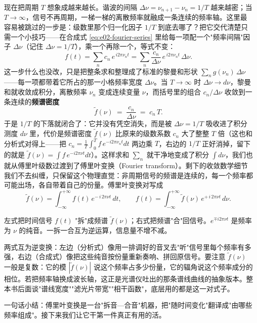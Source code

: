 现在把周期 \(T\) 想象成越来越长。谐波的间隔 \(\Delta\nu=\nu_{n+1}-\nu_n=1/T\) 越来越密；当 \(T\to\infty\)，信号不再周期，一梯一梯的离散频率就融成一条连续的频率轴。这里最容易被跳过的一步是：级数里那个归一化因子 \(1/T\) 到底去哪了？把它交代清楚只需一个小技巧——在合成式 \eqref{eq:e02-fourier-series} 里给每一项配一个"频率间隔"因子 \(\Delta\nu\)（记住 \(\Delta\nu=1/T\)），乘一个再除一个，等式不变：
\[
  f(t)=\sum_{n} c_n\,e^{\,i2\pi\nu_n t}
      =\sum_{n} \frac{c_n}{\Delta\nu}\,e^{\,i2\pi\nu_n t}\,\Delta\nu .
\]
这一步什么也没改，只是把整条求和整理成了标准的黎曼和形状 \(\sum_n g(\nu_n)\,\Delta\nu\)——每一项都带着它所占的那一小格频率宽度 \(\Delta\nu\)。当 \(T\to\infty\) 时 \(\Delta\nu\to d\nu\)，黎曼和就收敛成积分，离散频率 \(\nu_n\) 变成连续变量 \(\nu\)，而括号里的组合 \(c_n/\Delta\nu\) 收敛到一条连续的\textbf{频谱密度}
\[
  \tilde f(\nu)\;=\;\frac{c_n}{\Delta\nu}\;=\;c_n\,T .
\]
于是 \(1/T\) 的下落就闭合了：它并没有凭空消失，而是被 \(\Delta\nu=1/T\) 吸收进了积分测度 \(d\nu\) 里，代价是频谱密度 \(\tilde f(\nu)\) 比原来的级数系数 \(c_n\) 大了整整 \(T\) 倍（这也和分析式对得上——把 \(c_n=\frac1T\int_0^T f\,e^{-i2\pi\nu_n t}dt\) 两边乘 \(T\)，右边的 \(1/T\) 正好消掉，留下的就是 \(\tilde f(\nu)=\int f\,e^{-i2\pi\nu t}dt\)）。这样求和 \(\sum_n\) 就干净地变成了积分 \(\int d\nu\)，我们也就从傅里叶级数过渡到了傅里叶变换（Fourier transform）。剩下的收敛数学细节我们不去纠缠，只保留这个物理直觉：非周期信号的频谱是连续的，每一个频率都可能出场，各自带着自己的份量。傅里叶变换对写成
\begin{equation}
  \tilde f(\nu)=\int_{-\infty}^{+\infty} f(t)\,e^{-\,i\,2\pi\nu t}\,dt,
  \qquad
  f(t)=\int_{-\infty}^{+\infty} \tilde f(\nu)\,e^{+\,i\,2\pi\nu t}\,d\nu .
  \label{eq:e02-fourier-transform}
\end{equation}
\begin{formulaexplain}
左式把时间信号 \(f(t)\) "拆"成频谱 \(\tilde f(\nu)\)；右式把频谱"合"回信号。\(e^{\mp i2\pi\nu t}\) 是频率为 \(\nu\) 的纯音。一拆一合互为逆运算，信息量不增不减。
\end{formulaexplain}
两式互为逆变换：左边（分析式）像用一排调好的音叉去"听"信号里每个频率有多强，右边（合成式）像把这些纯音按份量重新奏响、拼回原信号。要注意 \(\tilde f(\nu)\) 一般是复数：它的模 \(|\tilde f(\nu)|\) 说这个频率占多少份量，它的辐角说这个频率成分的相位。若把频率轴换成波长轴，这正是光谱仪吐出的那条谱线曲线的抽象版本。整本书后面谈"谱线宽度""滤光片带宽""相干函数"，底层用的都是这一对式子。

一句话小结：傅里叶变换是一台"拆音—合音"机器，把"随时间变化"翻译成"由哪些频率组成"。接下来我们让它干第一件真正有用的活。


